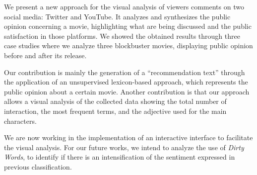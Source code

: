 
We present a new approach for the visual analysis of viewers comments on two social media: Twitter and YouTube. It analyzes and synthesizes the public opinion concerning a movie, highlighting what are being discussed and the public satisfaction in those platforms. We showed the obtained results through three case studies where we analyze three blockbuster movies, displaying public opinion before and after its release.

Our contribution is mainly the generation of a ``recommendation text'' through the application of an unsupervised lexicon-based approach, which represents the public opinion about a certain movie.  Another contribution is that our approach allows a visual analysis of the collected data showing the total number of interaction, the most frequent terms, and the adjective used for the main characters. 

We are now working in the implementation of an interactive interface to facilitate the visual analysis. For our future works, we intend to analyze the use of \textit{Dirty Words}, to identify if there is an intensification of the sentiment expressed in previous classification. 